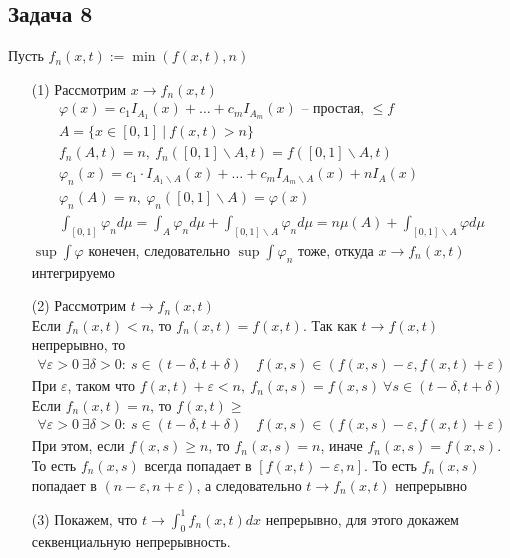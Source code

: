 \subsection*{Задача 8}
	Пусть $f_n(x,t) := \min(f(x,t),n)$
	\begin{enumerate}
	\item[(1)]	
		Рассмотрим $x \to f_n(x,t)$
		\begin{gather*}
			\varphi(x) = c_1 I_{A_1}(x) + \ldots + c_m I_{A_m}(x) \text{ -- простая, } \leqslant f\\
			A = \{x\in[0,1]\ |\ f(x,t) > n\}\\
			f_n(A,t) = n,\ f_n([0,1]\backslash A, t) = f([0,1]\backslash A,t)\\
			\varphi_n(x) = c_1 \cdot I_{A_1 \backslash A}(x) + \ldots + c_{m} I_{A_m \backslash A}(x) + n I_{A}(x)\\
			\varphi_n(A) = n,\ \varphi_n([0,1]\backslash A) = \varphi(x)\\
			\int_{[0,1]} \varphi_n d \mu = \int_A \varphi_n d \mu + \int_{[0,1] \backslash A} \varphi_n d \mu = n \mu (A) + \int_{[0,1] \backslash A} \varphi d \mu
		\end{gather*}
		$\sup \int \varphi$ конечен, следовательно $\sup \int \varphi_n$ тоже, откуда $x \to f_n(x,t)$ интегрируемо
	\item[(2)]
		Рассмотрим $t \to f_n(x,t)$\\
		Если $f_n(x,t) < n$, то $f_n(x,t) = f(x,t)$. Так как $t \to f(x,t)$ непрерывно, то 
		\begin{gather*}
			\forall \varepsilon >0\ \exists \delta >0:\ s \in (t-\delta, t+ \delta)\quad f(x,s) \in (f(x,s) - \varepsilon, f(x,t) + \varepsilon)
		\end{gather*}
		При $\varepsilon$, таком что $f(x,t) + \varepsilon < n,\ f_n(x,s) = f(x,s)\ \forall s\in (t-\delta, t+\delta)$\\
		Если $f_n(x,t) = n$, то $f(x,t) \geqslant$
		\begin{gather*}
			\forall \varepsilon >0\ \exists \delta >0:\ s \in (t-\delta, t+ \delta)\quad f(x,s) \in (f(x,s) - \varepsilon, f(x,t) + \varepsilon)
		\end{gather*}
		При этом, если $f(x,s) \geqslant n$, то $f_n(x,s) = n$, иначе $f_n(x,s) = f(x,s)$. То есть $f_n(x,s)$ всегда попадает в $[f(x,t)- \varepsilon, n]$. То есть $f_n(x,s)$ попадает в $(n-\varepsilon, n+\varepsilon)$, а следовательно $t \to f_n(x,t)$ непрерывно
	\item[(3)]
		Покажем, что $t \to \int_{0}^{1} f_n(x,t) dx$ непрерывно, для этого докажем секвенциальную непрерывность.\\

\end{enumerate}
